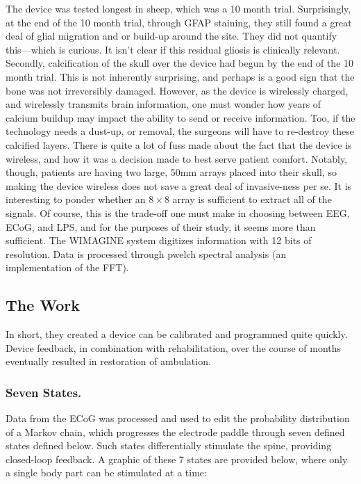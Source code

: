 The device was tested longest in sheep, which was a 10 month trial. Surprisingly, at the end of the 10 month trial, through GFAP staining, they still found a great deal of glial migration and or build-up around the site. They did not quantify this---which is curious. It isn't clear if this residual gliosis is clinically relevant. Secondly, calcification of the skull over the device had begun by the end of the 10 month trial. This is not inherently surprising, and perhaps is a good sign that the bone was not irreversibly damaged. However, as the device is wirelessly charged, and wirelessly transmits brain information, one must wonder how years of calcium buildup may impact the ability to send or receive information. Too, if the technology needs a dust-up, or removal, the surgeons will have to re-destroy these calcified layers. There is quite a lot of fuss made about the fact that the device is wireless, and how it was a decision made to best serve patient comfort. Notably, though, patients are having two large, 50mm arrays placed into their skull, so making the device wireless does not save a great deal of invasive-ness per se. It is interesting to ponder whether an $8\times 8$ array is sufficient to extract all of the signals. Of course, this is the trade-off one must make in choosing between EEG, ECoG, and LPS, and for the purposes of their study, it seems more than sufficient. The WIMAGINE system digitizes information with 12 bits of resolution. Data is processed through pwelch spectral analysis (an implementation of the FFT). 

\subsection{The Work} In short, they created a  device can be calibrated and programmed quite quickly. Device feedback, in combination with rehabilitation, over the course of months eventually resulted in restoration of ambulation. 

\subsubsection{Seven States.} 

Data from the ECoG was processed and used to edit the probability distribution of a Markov chain, which progresses the electrode paddle through seven defined states defined below. Such states differentially stimulate the spine, providing closed-loop feedback. A graphic of these 7 states are provided below, where only a single body part can be stimulated at a time: 

